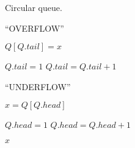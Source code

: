 
\begin{algorithm}[H]
  \caption{Circular queue.}
  \begin{algorithmic}[]
	\State \Return ``OVERFLOW''
      \EndIf
      
      \Statex
      \State $Q[Q.tail] = x$

      \Statex
        \State $Q.tail = 1$
      \Else 
        \State $Q.tail = Q.tail + 1$
      \EndIf
    \EndProcedure

    \Statex
	\State \Return ``UNDERFLOW''
      \EndIf

      \Statex
      \State $x = Q[Q.head]$
      
      \Statex
        \State $Q.head = 1$
      \Else
        \State $Q.head = Q.head + 1$
      \EndIf

      \Statex
      \State \Return $x$
    \EndProcedure
  \end{algorithmic}
\end{algorithm}
